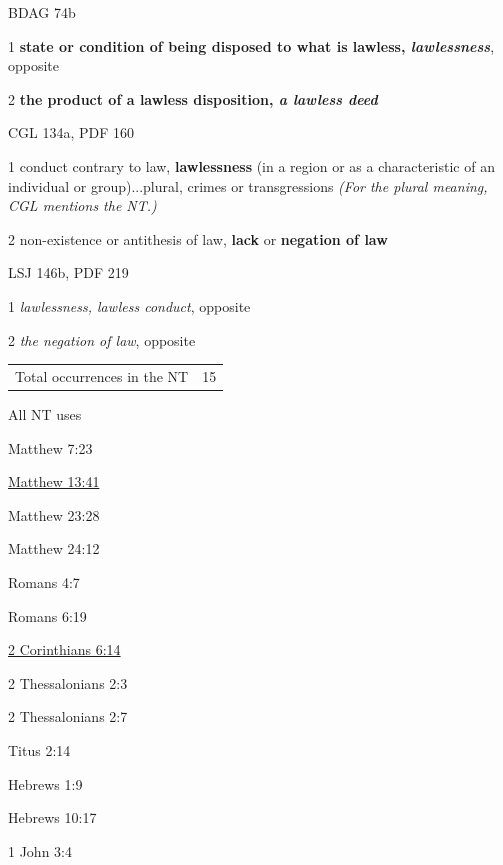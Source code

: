 				\begin{compactdesc}
					\item[BDAG 74b] \textbf{}
						\begin{compactitem}
							\item[1] \textbf{state or condition of being disposed to what is lawless, \textit{lawlessness}}, opposite 
							\item[2] \textbf{the product of a lawless disposition, \textit{a lawless deed}}
						\end{compactitem}
					\item[CGL 134a, PDF 160] \textbf{}
						\begin{compactitem}
							\item[1] conduct contrary to law, \textbf{lawlessness} (in a region or as a characteristic of an individual or group)...plural, crimes or transgressions \textit{(For the plural meaning, CGL mentions the NT.)}
							\item[2] non-existence or antithesis of law, \textbf{lack} or \textbf{negation of law}
						\end{compactitem}
					\item[LSJ 146b, PDF 219] \textbf{}
						\begin{compactitem}
							\item[1] \textit{lawlessness, lawless conduct}, opposite \gr{δικαιοσύνη}
							\item[2] \textit{the negation of law}, opposite \gr{νόμος}
						\end{compactitem}
				\end{compactdesc}
				
				\begin{tabular}{ll}
					Total occurrences in the NT & 15
				\end{tabular}
				
				\begin{compactdesc}
					\item[All NT uses] \textbf{}
						\begin{compactdesc}
							\item[Matthew 7:23] 
							\item[{\hyperref[MATTHEW-13-41]{Matthew 13:41}}]
							\item[Matthew 23:28]
							\item[Matthew 24:12] 
							\item[Romans 4:7]
							\item[Romans 6:19] 
							\item[{\hyperref[2 Corinthians 6:14]{2 Corinthians 6:14}}] 
							\item[2 Thessalonians 2:3]
							\item[2 Thessalonians 2:7]
							\item[Titus 2:14] 
							\item[Hebrews 1:9] 
							\item[Hebrews 10:17] 
							\item[1 John 3:4]
						\end{compactdesc}
				\end{compactdesc}
		
